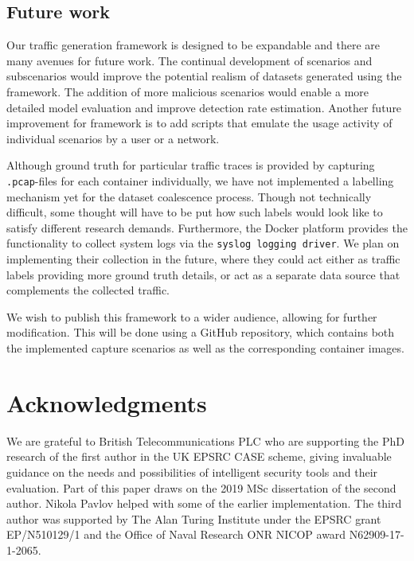 \documentclass[sigconf]{acmart}
\begin{document}
\subsection{Future work}

Our traffic generation framework is designed to be expandable and there are many avenues for future work. The continual development of scenarios and subscenarios would improve the potential realism of datasets generated using the framework. The addition of more malicious scenarios would enable a more detailed model evaluation and improve detection rate estimation. 
Another future improvement for framework is to add scripts that emulate the usage activity of individual scenarios by a user or a network. 


Although ground truth for particular traffic traces is provided by capturing \texttt{.pcap}-files for each container individually, we have not implemented a labelling mechanism yet for the dataset coalescence process. Though not technically difficult, some thought will have to be put how such labels would look like to satisfy different research demands.
Furthermore, the Docker platform provides the functionality to collect system logs via the \texttt{syslog logging driver}. We plan on implementing their collection in the future, where they could act either as traffic labels providing more ground truth details, or act as a separate data source that complements the collected traffic.

We wish to publish this framework to a wider audience, allowing for further modification. This will be done using a GitHub repository, which contains both the implemented capture scenarios as well as the corresponding container images.




\section{Acknowledgments}

We are grateful to  British Telecommunications PLC who are supporting the PhD research of the first
author in the UK EPSRC CASE scheme, giving invaluable guidance on the
needs and possibilities of intelligent security tools and their
evaluation.  Part of this paper draws on the 2019 MSc dissertation of
the second author.  %
Nikola Pavlov helped with some of the earlier implementation.  The
third author was supported by The Alan Turing Institute under the
EPSRC grant EP/N510129/1 and the Office of Naval Research ONR NICOP
award N62909-17-1-2065.
\end{document}
